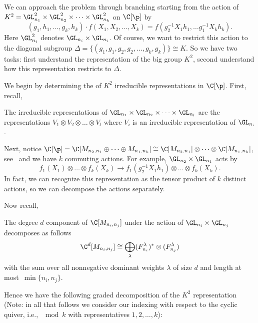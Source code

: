 We can approach the problem through branching starting from the action of $K^2 = \GL_{n_1}^2 \times \GL_{n_2}^2 \times  \dots \times \GL_{n_k}^2$ on $\C[\p]$  by 
$$(g_1,h_1, \dots ,g_k, h_k) \cdot f(X_1,X_2, \dots , X_k) = f(g_2^{-1} X_1 h_1, \dots g_1^{-1} X_k h_k).$$
Here $\GL_{n_i}^2$ denotes $\GL_{n_i} \times \GL_{n_i}$. Of course, we want to restrict this action to the diagonal subgroup $\Delta = \{(g_1,g_1,g_2,g_2, \dots , g_k,g_k) \} \cong K$. So we have two tasks: first understand the representation of the big group $K^2$, second understand how this representation restricts to $\Delta$. 

We begin by determining the of $K^2$ irreducible representations in $\C[\p]$. First, recall,
    
    \begin{prop} The irreducible representations of $\GL_{n_1} \times \GL_{n_2} \times \dots \times \GL_{n_l}$ are the representations $V_1 \otimes V_2 \otimes \dots \otimes V_l$ where $V_i$ is an irreducible representation of $\GL_{n_i}$.
    \end{prop}
        
Next, notice $\C[\p] = \C[M_{n_2,n_1} \oplus \dots \oplus M_{n_1,n_k}] \cong \C[M_{n_2,n_1} ]\otimes \dots \otimes \C[M_{n_1,n_k}]$, see~\cite[Lemma A.1.9]{GoodmanWallach2009} and we have $k$ commuting actions. For example, $\GL_{n_2} \times \GL_{n_1}$ acts by 
$$f_1(X_1) \otimes \dots \otimes f_k(X_k)\to f_1(g_2^{-1}X_1 h_1) \otimes \dots \otimes f_k(X_k).$$
In fact, we can recognize this representation as the tensor product of $k$ distinct actions, so we can decompose the actions separately. 

Now recall,

    \begin{thm} The degree $d$ component of $\C[M_{n_i,n_j}]$ under the action of $\GL_{n_i} \times \GL_{n_j}$ decomposes as follows
$$\C^d[M_{n_i,n_j}] \cong \bigoplus_\lambda (F_{n_i}^\lambda)^*\otimes (F_{n_j}^\lambda)$$
with the sum over all nonnegative dominant weights $\lambda$ of size $d$ and length at most~$\min\{n_i,n_j\}$.
\end{thm}

Hence we have the following graded decomposition of the $K^2$ representation (Note: in all that follows we consider our indexing with respect to the cyclic quiver, i.e., $\mod k$ with representatives $1, 2, \ldots, k$):

